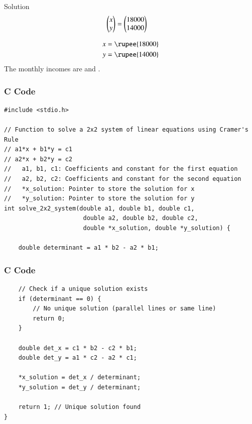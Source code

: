 \documentclass{beamer}
\begin{document}
\begin{frame}{Solution}
\begin{align}
\begin{pmatrix}x\\y\end{pmatrix}&=\begin{pmatrix}18000\\14000\end{pmatrix}
\end{align}

\begin{align}
x &= \rupee{18000} \\
y &= \rupee{14000}
\end{align}
The monthly incomes are  and .
\end{frame}

\begin{frame}[fragile]
\frametitle{C Code}
\begin{lstlisting}
#include <stdio.h>

// Function to solve a 2x2 system of linear equations using Cramer's Rule
// a1*x + b1*y = c1
// a2*x + b2*y = c2
//   a1, b1, c1: Coefficients and constant for the first equation
//   a2, b2, c2: Coefficients and constant for the second equation
//   *x_solution: Pointer to store the solution for x
//   *y_solution: Pointer to store the solution for y
int solve_2x2_system(double a1, double b1, double c1,
                      double a2, double b2, double c2,
                      double *x_solution, double *y_solution) {

    double determinant = a1 * b2 - a2 * b1;
\end{lstlisting}
\end{frame}

\begin{frame}[fragile]
\frametitle{C Code}
\begin{lstlisting}
    // Check if a unique solution exists
    if (determinant == 0) {
        // No unique solution (parallel lines or same line)
        return 0;
    }

    double det_x = c1 * b2 - c2 * b1;
    double det_y = a1 * c2 - a2 * c1;

    *x_solution = det_x / determinant;
    *y_solution = det_y / determinant;

    return 1; // Unique solution found
}
\end{lstlisting}
\end{frame}
\end{document}
